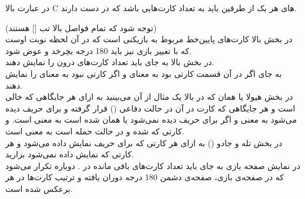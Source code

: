 \documentclass[]{article}
\begin{document}
در عبارت بالا C‌ های هر یک از طرفین باید به تعداد کارت‌هایی باشد که در دست دارند.


(توجه شود که تمام فواصل بالا تب [] هستند)  
\\
در بخش بالا کارت‌های پایین‌خط مربوط به بازیکنی است که در آن لحظه نوبت اوست که با 
تغییر  بازی نیز باید 180 درجه بچرخد و عوض شود.
\\
در بخش بالا به جای  باید تعداد کارت‌های درون  را نمایش 
دهند.
\\
به جای  اگر در آن قسمت کارتی بود  به معنای  و اگر 
کارتی نبود  به معنای  را نمایش دهند.
\\
در بخش هیولا یا همان  که در بالا یک مثال از آن می‌بینید به 
ازای هر جایگاهی که خالی است  و هر جایگاهی که کارت در آن در حالت دفاعی 
() قرار گرفته و برای حریف دیده می‌شود  به معنی
  و اگر برای حریف دیده نمی‌شود یا همان  شده است 
 به معنی  است. و کارتی که  شده و در حالت حمله 
 است  به 
 معنی  است.
\\
در بخش تله و جادو () به ازای هر کارتی که برای حریف نمایش 
داده می‌شود  و هر کارتی که نمایش داده نمی‌شود  بزارید.
\\
در نمایش صفحه بازی به جای  باید تعداد کارت‌های باقی مانده در 
. دوباره تکرار می‌شود که در صفحه‌ی بازی‌، صفحه‌ی دشمن 180 درجه دوران 
یافته و ترتیب کارت‌ها در هر  برعکس شده است.
\end{document}
